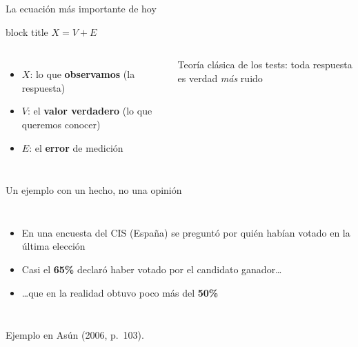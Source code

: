 \documentclass[aspectratio=169,11pt]{beamer}
\newcommand{\hl}[1]{\textcolor{marino}{\textbf{#1}}}        %
\newcommand{\hlr}[1]{\textcolor{acero}{\textbf{#1}}}        %
\newcommand{\fuente}[1]{\par\vfill{\scriptsize\color{gris}#1\par}}
\begin{document}
\begin{frame}{La ecuación más importante de hoy}
\begin{center}
\begin{beamercolorbox}[rounded=true, sep=8pt, center, wd=0.4\textwidth]{block title}
\Large $X = V + E$
\end{beamercolorbox}
\end{center}
\bigskip
\begin{columns}[c]
\begin{itemize}
  \item $X$: lo que \textbf{observamos} (la respuesta)
  \item $V$: el \hl{valor verdadero} (lo que queremos conocer)
  \item $E$: el \textbf{error} de medición
\end{itemize}
\bigskip
\footnotesize Teoría clásica de los tests: toda respuesta es verdad \emph{más} ruido
\centering
{}
\end{columns}
\end{frame}

\begin{frame}{Un ejemplo con un hecho, no una opinión}
\begin{columns}[c]
\begin{itemize}
  \item En una encuesta del CIS (España) se preguntó por quién habían votado en la última elección
  \item Casi el \hlr{65\%} declaró haber votado por el candidato ganador\ldots
  \item \ldots que en la realidad obtuvo poco más del \hl{50\%}
\end{itemize}
\centering
{}
\end{columns}
\fuente{Ejemplo en Asún (2006, p.~103).}
\end{frame}
\end{document}
